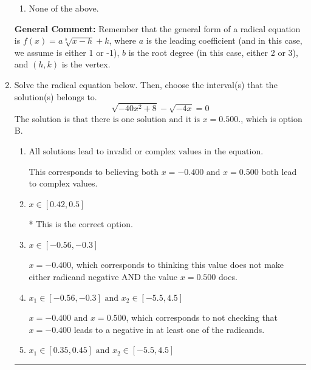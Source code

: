 \documentclass{extbook}[14pt]
\newcommand{\litem}[1]{\item #1

\rule{\textwidth}{0.4pt}}
\begin{document}
\begin{enumerate}
{\begin{enumerate}[label=\Alph*.]
\item None of the above.\end{enumerate}
\textbf{General Comment:} Remember that the general form of a radical equation is $ f(x) = a \sqrt[b]{x - h} + k $, where $a$ is the leading coefficient (and in this case, we assume is either 1 or -1), $b$ is the root degree (in this case, either 2 or 3), and $(h, k)$ is the vertex.
}
\litem{
Solve the radical equation below. Then, choose the interval(s) that the solution(s) belongs to.
\[ \sqrt{-40 x^2 + 8} - \sqrt{-4 x} = 0 \]The solution is \( \text{that there is one solution and it is } x = 0.500. \), which is option B.\begin{enumerate}[label=\Alph*.]
\item \( \text{All solutions lead to invalid or complex values in the equation.} \)

This corresponds to believing both $x = -0.400 \text{ and } x = 0.500$ both lead to complex values.
\item \( x \in [0.42,0.5] \)

* This is the correct option.
\item \( x \in [-0.56,-0.3] \)

$x = -0.400$, which corresponds to thinking this value does not make either radicand negative AND the value $x = 0.500$ does.
\item \( x_1 \in [-0.56, -0.3] \text{ and } x_2 \in [-5.5,4.5] \)

$x = -0.400 \text{ and } x = 0.500$, which corresponds to not checking that $x = -0.400$ leads to a negative in at least one of the radicands.
\item \( x_1 \in [0.35, 0.45] \text{ and } x_2 \in [-5.5,4.5] \)


\end{enumerate}}
\end{enumerate}
\end{document}
